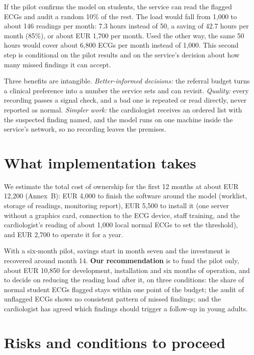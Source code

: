 \documentclass[letterpaper,11pt]{article}
\begin{document}
If the pilot confirms the model on students, the service can read the flagged ECGs and audit a random 10\% of the rest. The load would fall from 1,000 to about 146 readings per month: 7.3 hours instead of 50, a saving of 42.7 hours per month (85\%), or about EUR 1,700 per month. Used the other way, the same 50 hours would cover about 6,800 ECGs per month instead of 1,000. This second step is conditional on the pilot results and on the service's decision about how many missed findings it can accept.

Three benefits are intangible. \emph{Better-informed decisions:} the referral budget turns a clinical preference into a number the service sets and can revisit. \emph{Quality:} every recording passes a signal check, and a bad one is repeated or read directly, never reported as normal. \emph{Simpler work:} the cardiologist receives an ordered list with the suspected finding named, and the model runs on one machine inside the service's network, so no recording leaves the premises.

\section*{What implementation takes}

We estimate the total cost of ownership for the first 12 months at about EUR 12,200 (Annex~B): EUR 4,000 to finish the software around the model (worklist, storage of readings, monitoring report), EUR 5,500 to install it (one server without a graphics card, connection to the ECG device, staff training, and the cardiologist's reading of about 1,000 local normal ECGs to set the threshold), and EUR 2,700 to operate it for a year.

With a six-month pilot, savings start in month seven and the investment is recovered around month 14. \textbf{Our recommendation} is to fund the pilot only, about EUR 10,850 for development, installation and six months of operation, and to decide on reducing the reading load after it, on three conditions: the share of normal student ECGs flagged stays within one point of the budget; the audit of unflagged ECGs shows no consistent pattern of missed findings; and the cardiologist has agreed which findings should trigger a follow-up in young adults.

\section*{Risks and conditions to proceed}
\end{document}
